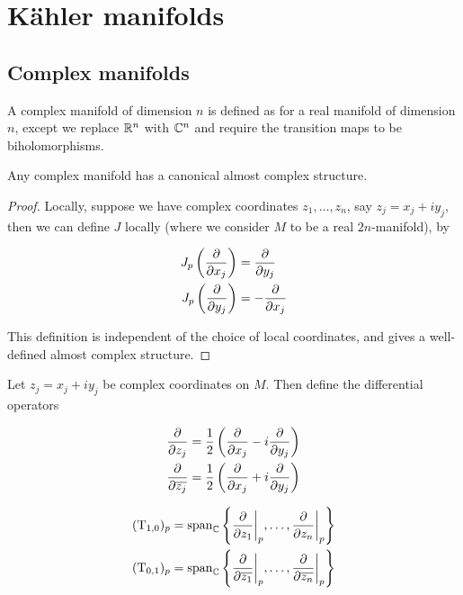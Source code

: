 \section{K\"ahler manifolds}

\subsection{Complex manifolds}

\begin{definition}
     A complex manifold of dimension \(n\) is defined as for a real manifold of dimension \(n\), except we replace \(\mathbb{R}^n\) with \(\mathbb{C}^n\) and require the transition maps to be biholomorphisms.
\end{definition}

\begin{proposition}
    Any complex manifold has a canonical almost complex structure.
\end{proposition}

\begin{proof}
    Locally, suppose we have complex coordinates \(z_1, \dots, z_n\), say \(z_j = x_j + iy_j\), then we can define \(J\) locally (where we consider \(M\) to be a real \(2n\)-manifold), by

    \begin{align*}
        J_p\left(\pdv{x_j}\right) &= \pdv{y_j} \\
        J_p\left(\pdv{y_j}\right) &= -\pdv{x_j}
    \end{align*}

    This definition is independent of the choice of local coordinates, and gives a well-defined almost complex structure.
\end{proof}

\begin{definition}
    Let \(z_j = x_j + iy_j\) be complex coordinates on \(M\). Then define the differential operators

    \begin{align*}
        \pdv{z_j} &= \frac{1}{2}\left(\pdv{x_j} - i\pdv{y_j}\right) \\
        \pdv{\overline{z_j}} &= \frac{1}{2}\left(\pdv{x_j} + i\pdv{y_j}\right)
    \end{align*}
\end{definition}

\begin{lemma}
    \begin{align*}
        (\mathrm{T}_{1, 0})_p &= \operatorname{span}_{\mathbb{C}}\left\{\pdv{z_1}\bigg\vert_p, \dots, \pdv{z_n}\bigg\vert_p\right\} \\
        (\mathrm{T}_{0, 1})_p &= \operatorname{span}_{\mathbb{C}}\left\{\pdv{\overline{z_1}}\bigg\vert_p, \dots, \pdv{\overline{z_n}}\bigg\vert_p\right\}
    \end{align*}
\end{lemma}

